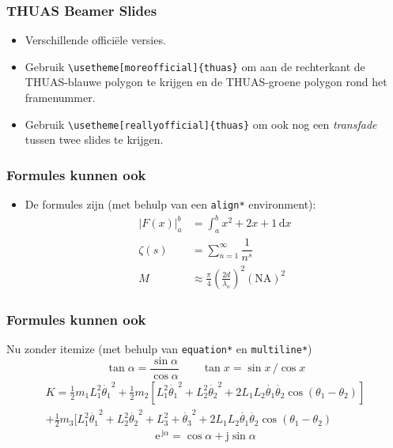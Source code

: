 \documentclass[fleqn,aspectratio=169,dutch,10pt]{beamer}
\begin{document}
\begin{frame}[fragile]
\frametitle{THUAS Beamer Slides}
\begin{itemize}
\item Verschillende offici\"ele versies.
\item Gebruik \lstinline|\usetheme[moreofficial]{thuas}| om aan de rechterkant de THUAS-blauwe polygon te krijgen en de THUAS-groene polygon rond het framenummer.
\item Gebruik \lstinline|\usetheme[reallyofficial]{thuas}| om ook nog een \textsl{transfade} tussen twee slides te krijgen.
\end{itemize}
\end{frame}


\begin{frame}
\frametitle{Formules kunnen ook}
\begin{itemize}
\item De formules zijn (met behulp van een \lstinline|align*| environment):
\begin{align*}
\left|F(x)\right|^b_a &= \int_a^b x^2 + 2x + 1 \, \mathrm{d} x \\
\zeta (s) &= \sum_{n=1}^\infty \dfrac{1}{n^{s}} \\
M&\approx\frac{\pi}{4}\left(\frac{2d}{\lambda_o}\right)^2\left(\mathrm{NA}\right)^2
\end{align*}
\end{itemize}
\end{frame}


\begin{frame}
\frametitle{Formules kunnen ook}
Nu zonder itemize (met behulp van \lstinline|equation*| en \lstinline|multiline*|)
\begin{equation*}
\tan \alpha = \dfrac{\sin \alpha}{\cos \alpha} \qquad \tan x = \sin x \, / \cos x
\end{equation*}%
\begin{multline*}  
K=\displaystyle{\frac{1}{2}m_1 L_1^2 \dot{\theta_1}^2+\frac{1}{2} m_2[L_1^2 \dot{\theta_1}^2+L_2^2 \dot{\theta_2}^2+2 L_1 L_2 \dot{\theta_1}\dot{\theta_2}\cos(\theta_1-\theta_2)]} \\
 \displaystyle{+\frac{1}{2}m_3[L_1^2 \dot{\theta_1}^2+L_2^2 \dot{\theta_2}^2+L_3^2+ \dot{\theta_3}^2+2 L_1 L_2 \dot{\theta_1}\dot{\theta_2}\cos(\theta_1-\theta_2)}
\end{multline*}%
\begin{equation*}
\mathrm{e}^{\, \mathrm{j}\alpha} = \cos \alpha + \mathrm{j} \sin \alpha
\end{equation*}
\end{frame}
\end{document}
